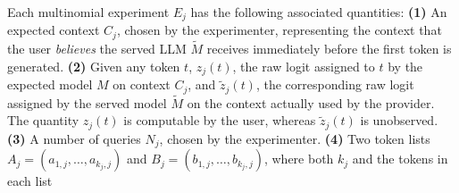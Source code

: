 \documentclass{article}
\begin{document}
Each multinomial experiment $E_j$ has the following associated quantities:
\noindent \textbf{(1)} An expected context $C_j$, chosen by the experimenter,
representing the context that the user \emph{believes} the served LLM
$\widetilde{M}$ receives immediately before the first token is generated. \textbf{(2)}
Given any token $t$, $z_j(t)$, the raw logit assigned to $t$ by the expected
model $M$ on context $C_j$, and $\widetilde{z}_j(t)$, the corresponding raw
logit assigned by the served model $\widetilde{M}$ on the context actually used
by the provider. The quantity $z_j(t)$ is computable by the user, whereas
$\widetilde{z}_j(t)$ is unobserved. \textbf{(3)} A number of queries $N_j$, chosen by the
experimenter. \textbf{(4)} Two token lists $A_j=(a_{1,j},\ldots,a_{k_j,j})$ and
$B_j=(b_{1,j},\ldots,b_{k_j,j})$, where both $k_j$ and the tokens in each list
\end{document}
